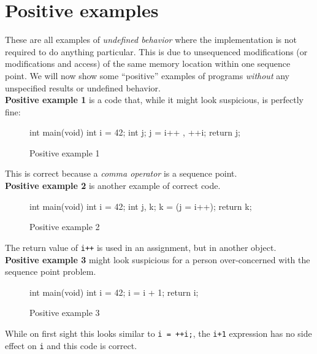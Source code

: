 \section{Positive examples}
These are all examples of \emph{undefined behavior} where the implementation is not required to do anything particular. This is due to unsequenced modifications (or modifications and access) of the same memory location within one sequence point. We will now show some ``positive'' examples of programs \emph{without} any unspecified results or undefined behavior.
\\

\textbf{Positive example 1} is a code that, while it might look suspicious, is perfectly fine:

\begin{figure}[h!]
\caption{Positive example 1}
\begin{code}
int main(void){
    int i = 42;
    int j;
    j = i++ , ++i;
    return j;
}
\end{code}
\end{figure}

This is correct because a \emph{comma operator} is a sequence point.
\\

\textbf{Positive example 2} is another example of correct code.

\begin{figure}[h!]
\caption{Positive example 2}
\begin{code}
int main(void){
    int i = 42;
    int j, k;
    k = (j = i++);
    return k;
}
\end{code}
\end{figure}

The return value of \verb|i++| is used in an assignment, but in another object.
\\

\textbf{Positive example 3} might look suspicious for a person over-concerned with the sequence point problem.

\begin{figure}[h!]
\caption{Positive example 3}
\begin{code}
int main(void){
    int i = 42;
    i = i + 1;
    return i;
}
\end{code}
\end{figure}

While on first sight this looks similar to \verb|i = ++i;|, the \verb|i+1| expression has no side effect on \verb|i| and this code is correct.

